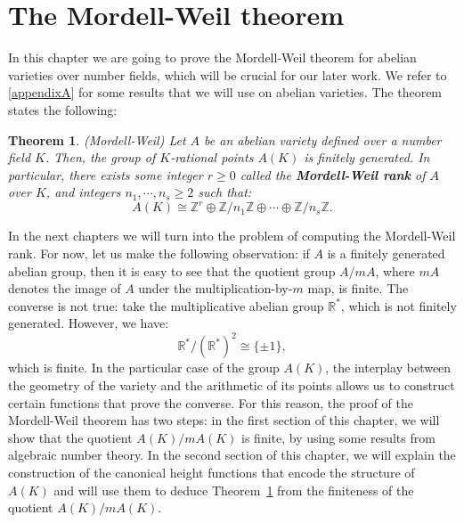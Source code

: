 \documentclass[a4paper, 12pt]{amsart}
\theoremstyle{definition}
\theoremstyle{plain}
\theoremstyle{plain}
\newtheorem{thm0}[defn0]{Theorem}
\theoremstyle{plain}
\theoremstyle{plain}
\theoremstyle{remark}
\theoremstyle{remark}
\theoremstyle{plain}
\newenvironment{theorem}{ \begin{thm0}}{\end{thm0}}
\newcommand{\thmref}[1]{Theorem~\ref{#1}}
\newcommand{\Z}{\mathbb{Z}}
\newcommand{\Zmod}[1]{\mathbb{Z}/#1\mathbb{Z}}
\begin{document}
	
	
	
	\newpage
	\thispagestyle{plain}
	\section{The Mordell-Weil theorem}
	In this chapter we are going to prove the Mordell-Weil theorem for abelian varieties over number fields, which will be crucial for our later work. We refer to \ref{appendixA} for some results that we will use on abelian varieties. The theorem states the following:
	
	\begin{theorem}\label{mordellweiltheorem}(Mordell-Weil)
		Let $A$ be an abelian variety defined over a number field $K$. Then, the group of $K$-rational points $A(K)$ is finitely generated. In particular, there exists some integer $r\ge 0$ called the \textbf{Mordell-Weil rank} of $A$ over $K$, and integers $n_1,\cdots,n_s\ge 2$ such that:
		\begin{equation*}
			A(K)\cong \Z^r\oplus \Zmod{n_1}\oplus\cdots\oplus\Zmod{n_s}.
		\end{equation*}
	\end{theorem}
	In the next chapters we will turn into the problem of computing the Mordell-Weil rank. For now, let us make the following observation: if $A$ is a finitely generated abelian group, then it is easy to see that the quotient group $A/mA$, where $mA$ denotes the image of $A$ under the multiplication-by-$m$ map, is finite. The converse is not true: take the multiplicative abelian group $\mathbb{R}^*$, which is not finitely generated. However, we have:
	\begin{equation*}
		\mathbb{R}^*/(\mathbb{R}^*)^2\cong\{\pm 1\},
	\end{equation*}
	which is finite. In the particular case of the group $A(K)$, the interplay between the geometry of the variety and the arithmetic of its points allows us to construct certain functions that prove the converse. For this reason, the proof of the Mordell-Weil theorem has two steps: in the first section of this chapter, we will show that the quotient $A(K)/mA(K)$ is finite, by using some results from algebraic number theory. In the second section of this chapter, we will explain the construction of the canonical height functions that encode the structure of $A(K)$ and will use them to deduce \thmref{mordellweiltheorem} from the finiteness of the quotient $A(K)/mA(K)$.
	
\end{document}
